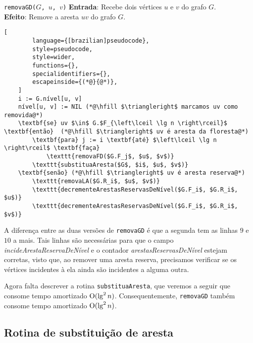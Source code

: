 \begin{programruledcaption}{\texttt{removaGD($G$, $u$, $v$)} \label{prog:removeGD-version2}}
    \noindent\textbf{Entrada}: Recebe dois vértices $u$ e $v$ do grafo $G$. \\
    \noindent\textbf{Efeito}: Remove a aresta $uv$ do grafo $G$. 
    \vspace{-0.5\baselineskip}
    \begin{lstlisting}[
        language={[brazilian]pseudocode},
        style=pseudocode,
        style=wider,
        functions={},
        specialidentifiers={},
        escapeinside={(*@}{@*)},
    ]
    i := G.nível[u, v]
    nível[u, v] := NIL (*@\hfill $\triangleright$ marcamos uv como removida@*)
    \textbf{se} uv $\in$ G.$F_{\left\lceil \lg n \right\rceil}$ \textbf{então}  (*@\hfill $\triangleright$ uv é aresta da floresta@*)
        \textbf{para} j := i \textbf{até} $\left\lceil \lg n \right\rceil$ \textbf{faça}
            \texttt{removaFD($G.F_j$, $u$, $v$)}
        \texttt{substituaAresta($G$, $i$, $u$, $v$)}
    \textbf{senão} (*@\hfill $\triangleright$ uv é aresta reserva@*)
        \texttt{removaLA($G.R_i$, $u$, $v$)}
        \texttt{decrementeArestasReservasDeNível($G.F_i$, $G.R_i$, $u$)}
        \texttt{decrementeArestasReservasDeNível($G.F_i$, $G.R_i$, $v$)}
    \end{lstlisting}
    \vspace{-0.5\baselineskip}
\end{programruledcaption}

A diferença entre as duas versões de \texttt{removaGD} é que a segunda tem as linhas $9$ e $10$ a mais. Tais linhas são necessárias para que o campo \textit{incideArestaReservaDeNível} e o contador \textit{arestasReservasDeNível} estejam corretas, visto que, ao remover uma aresta reserva, precisamos verificar se os vértices incidentes à ela ainda são incidentes a alguma outra. 

Agora falta descrever a rotina \texttt{substituaAresta}, que veremos a seguir que consome tempo amortizado $\mathrm{O}(\lg^2 n)$. Consequentemente, \texttt{removaGD} também consome tempo amortizado $\mathrm{O}(\lg^2 n)$.

\subsection{Rotina de substituição de aresta}
\label{sec:replace-edge}

